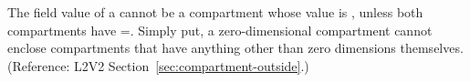 The  field value of a \Compartment cannot be a compartment
whose  value is , unless both compartments
have =.  Simply put, a zero-dimensional
compartment cannot enclose compartments that have anything other than zero
dimensions themselves.  (Reference: L2V2
Section~\ref{sec:compartment-outside}.)
